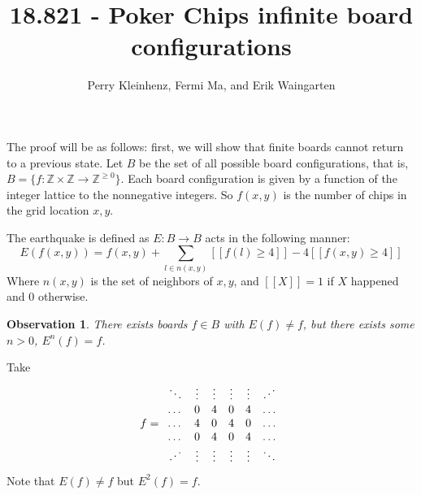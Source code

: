 \documentclass[11pt]{article}
\author{Perry Kleinhenz, Fermi Ma, and Erik Waingarten}
\title{18.821 - Poker Chips infinite board configurations}
\newtheorem{observation}{Observation}
\begin{document}
         
\maketitle

The proof will be as follows: first, we will show that finite boards cannot return to a previous state. Let $B$ be the set of all possible board configurations, that is, $B = \{ f: \mathbb{Z} \times \mathbb{Z} \rightarrow \mathbb{Z}^{\geq 0}\}$. Each board configuration is given by a function of the integer lattice to the nonnegative integers. So $f(x,y)$ is the number of chips in the grid location $x,y$. 

The earthquake is defined as $E: B \rightarrow B$ acts in the following manner:
\[ E(f(x,y)) = f(x,y) + \sum_{l \in n(x,y)} [[ f(l) \geq 4 ]] - 4[[f(x,y) \geq 4]] \]
Where $n(x,y)$ is the set of neighbors of $x,y$, and $[[ X ]] = 1$ if $X$ happened and $0$ otherwise.

\begin{observation}
There exists boards $f \in B$ with $E(f) \neq f$, but there exists some $n > 0$, $E^n(f) = f$.
\end{observation}
Take
\[ f = \begin{array}{cccccc} \ddots & \vdots & \vdots & \vdots & \vdots & \reflectbox{$\ddots$} \\
				      \dots & 0 & 4 & 0 & 4 & \dots \\
				      \dots & 4 & 0 & 4 & 0 & \dots \\
				      \dots & 0 & 4 & 0 & 4 & \dots \\
				      \reflectbox{$\ddots$} & \vdots & \vdots & \vdots & \vdots & \ddots \end{array} \]
Note that $E(f) \neq f$ but $E^2(f) = f$.
					
\end{document}
